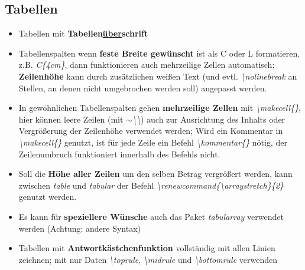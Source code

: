 \documentclass[./main.tex]{subfiles}
\begin{document}
\subsection{Tabellen}
\begin{itemize}
    \item Tabellen mit \textbf{Tabellen\underline{\"uber}schrift}
    \item Tabellenspalten wenn \textbf{feste Breite gew\"unscht} ist als C oder L formatieren, z.B. \textit{C\{4cm\}}, dann funktionieren auch mehrzeilige Zellen automatisch; \textbf{Zeilenh\"ohe} kann durch zus\"atzlichen wei\ss{}en Text (und evtl. \textit{\textbackslash nolinebreak} an Stellen, an denen nicht umgebrochen werden soll) angepasst werden. 
    \item In gew\"ohnlichen Tabellenspalten gehen \textbf{mehrzeilige Zellen} mit \textit{\textbackslash makecell\{\}}, hier k\"onnen leere Zeilen (mit \textit{$\sim$\textbackslash\textbackslash}) auch zur Ausrichtung des Inhalts oder Vergr\"o\ss{}erung der Zeilenh\"ohe verwendet werden; Wird ein Kommentar in \textit{\textbackslash makecell\{\}} genutzt, ist f\"ur jede Zeile ein Befehl \textit{\textbackslash kommentar\{\}} n\"otig, der Zeilenumbruch funktioniert innerhalb des Befehls nicht.
    \item Soll die \textbf{H\"ohe aller Zeilen} um den selben Betrag vergr\"o\ss{}ert werden, kann zwischen \textit{table} und \textit{tabular} der Befehl \textit{\textbackslash renewcommand\{\textbackslash arraystretch\}\{2\}} genutzt werden.
    \item Es kann f\"ur \textbf{speziellere W\"unsche} auch das Paket \textit{tabularray} verwendet werden (Achtung: andere Syntax)
    \item Tabellen mit \textbf{Antwortk\"astchenfunktion} vollst\"andig mit allen Linien zeichnen; mit nur Daten \textit{\hypertarget{toprule}{\textbackslash toprule}}, \textit{\hypertarget{midrule}{\textbackslash midrule}} und \textit{\hypertarget{bottomrule}{\textbackslash bottomrule}} verwenden
\end{itemize}


\pagebreak
\end{document}
